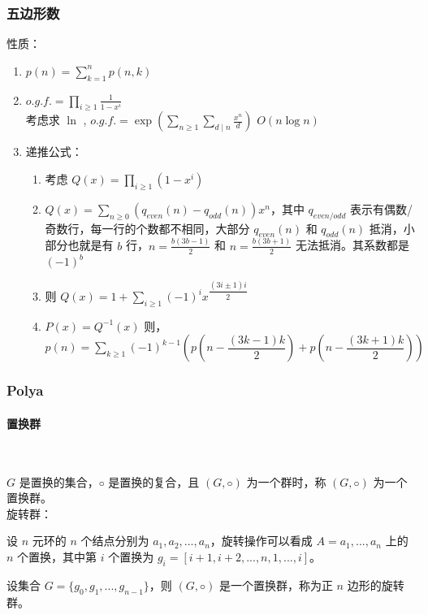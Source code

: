 \subsubsection{五边形数}

性质：
\begin{enumerate}
    \item $p(n)=\sum\limits_{k=1}^{n}p(n,k)$
    \item $o.g.f.=\prod\limits_{i\ge1}{\frac{1}{1-x^i}}$\\
    考虑求 $\ln$ , $o.g.f.=\exp(\sum_{n\ge1}{\sum_{d\mid n} {\frac{x^n}{d}}})$ $O(n\log{n})$
    \item 递推公式：
        \begin{enumerate}
            \item 考虑 $Q(x)=\prod_{i\ge1}(1-x^i)$
            \item $Q(x)=\sum_{n\ge0}(q_{even}(n)-q_{odd}(n))x^n，其中 $ $q_{even/odd}$ 表示有偶数/奇数行，每一行的个数都不相同，大部分 $q_{even}(n)$ 和 $q_{odd}(n)$ 抵消，小部分也就是有 $b$ 行，$n=\frac{b(3b-1)}{2}$ 和 $n=\frac{b(3b+1)}{2}$ 无法抵消。其系数都是 $(-1)^b$
            \item 则 $Q(x)=1+\sum_{i\ge1}(-1)^ix^{\dfrac{(3i\pm1)i}{2}}$
            \item $P(x)=Q^{-1}(x)$ 则，$p(n)=\sum_{k\ge1}(-1)^{k-1}\left(p\left(n-\dfrac{(3k-1)k}{2}\right)+p\left(n-\dfrac{(3k+1)k}{2}\right)\right)$
        \end{enumerate}
\end{enumerate}

\subsubsection{Polya}

\paragraph{置换群}\

$G$ 是置换的集合，$◦$ 是置换的复合，且 $(G, ◦)$ 为一个群时，称 $(G, ◦)$ 为一个置换群。 \\


\noindent 旋转群：

设 $n$ 元环的 $n$ 个结点分别为 $a_1,a_2, ...,a_n$，旋转操作可以看成 $A = {a_1, ..., a_n}$ 上的 $n$ 个置换，其中第 $i$ 个置换为 $g_i = [i + 1,i + 2, ...,n,1, ...,i]$。 

设集合 $G= \{g_0,g_1, ...,g_{n−1}\}$，则 $(G,◦)$ 是一个置换群，称为正 $n$ 边形的旋转群。\\

